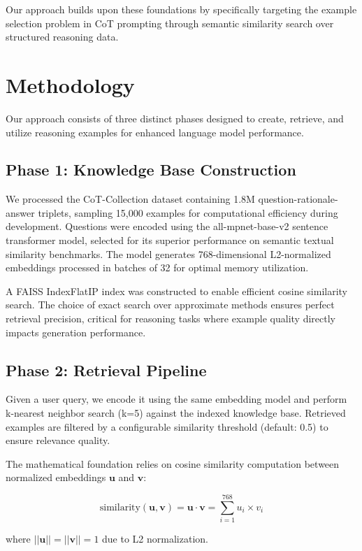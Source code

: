 \documentclass{article}
\begin{document}
Our approach builds upon these foundations by specifically targeting the example selection problem in CoT prompting through semantic similarity search over structured reasoning data.

\section{Methodology}

Our approach consists of three distinct phases designed to create, retrieve, and utilize reasoning examples for enhanced language model performance.

\subsection{Phase 1: Knowledge Base Construction}

We processed the CoT-Collection dataset containing 1.8M question-rationale-answer triplets, sampling 15,000 examples for computational efficiency during development. Questions were encoded using the all-mpnet-base-v2 sentence transformer model, selected for its superior performance on semantic textual similarity benchmarks. The model generates 768-dimensional L2-normalized embeddings processed in batches of 32 for optimal memory utilization.

A FAISS IndexFlatIP index was constructed to enable efficient cosine similarity search. The choice of exact search over approximate methods ensures perfect retrieval precision, critical for reasoning tasks where example quality directly impacts generation performance.

\subsection{Phase 2: Retrieval Pipeline}

Given a user query, we encode it using the same embedding model and perform k-nearest neighbor search (k=5) against the indexed knowledge base. Retrieved examples are filtered by a configurable similarity threshold (default: 0.5) to ensure relevance quality.

The mathematical foundation relies on cosine similarity computation between normalized embeddings $\mathbf{u}$ and $\mathbf{v}$:

$$\text{similarity}(\mathbf{u}, \mathbf{v}) = \mathbf{u} \cdot \mathbf{v} = \sum_{i=1}^{768} u_i \times v_i$$

where $||\mathbf{u}|| = ||\mathbf{v}|| = 1$ due to L2 normalization.
\end{document}
